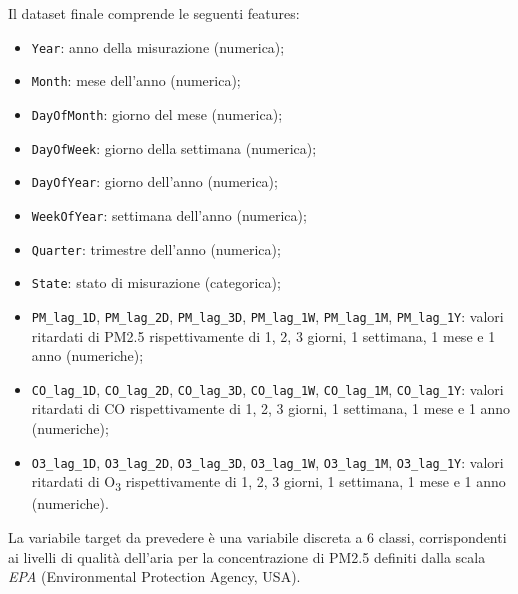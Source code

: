 \documentclass[a4paper,12pt]{report}
\begin{document}
	Il dataset finale comprende le seguenti features:
	\begin{itemize}
		\item \texttt{Year}: anno della misurazione (numerica);
		\item \texttt{Month}: mese dell’anno (numerica);
		\item \texttt{DayOfMonth}: giorno del mese (numerica);
		\item \texttt{DayOfWeek}: giorno della settimana (numerica);
		\item \texttt{DayOfYear}: giorno dell’anno (numerica);
		\item \texttt{WeekOfYear}: settimana dell’anno (numerica);
		\item \texttt{Quarter}: trimestre dell’anno (numerica);
		\item \texttt{State}: stato di misurazione (categorica);
		\item \texttt{PM\_lag\_1D}, \texttt{PM\_lag\_2D}, \texttt{PM\_lag\_3D}, \texttt{PM\_lag\_1W}, \texttt{PM\_lag\_1M}, \texttt{PM\_lag\_1Y}: valori ritardati di PM2.5 rispettivamente di 1, 2, 3 giorni, 1 settimana, 1 mese e 1 anno (numeriche);
		\item \texttt{CO\_lag\_1D}, \texttt{CO\_lag\_2D}, \texttt{CO\_lag\_3D}, \texttt{CO\_lag\_1W}, \texttt{CO\_lag\_1M}, \texttt{CO\_lag\_1Y}: valori ritardati di CO rispettivamente di 1, 2, 3 giorni, 1 settimana, 1 mese e 1 anno (numeriche);
		\item \texttt{O3\_lag\_1D}, \texttt{O3\_lag\_2D}, \texttt{O3\_lag\_3D}, \texttt{O3\_lag\_1W}, \texttt{O3\_lag\_1M}, \texttt{O3\_lag\_1Y}: valori ritardati di O\textsubscript{3} rispettivamente di 1, 2, 3 giorni, 1 settimana, 1 mese e 1 anno (numeriche).
	\end{itemize}
	
	La variabile target da prevedere è una variabile discreta a 6 classi, corrispondenti ai livelli di qualità dell’aria per la concentrazione di PM2.5 definiti dalla scala \textit{EPA} (Environmental Protection Agency, USA).
	
\end{document}
